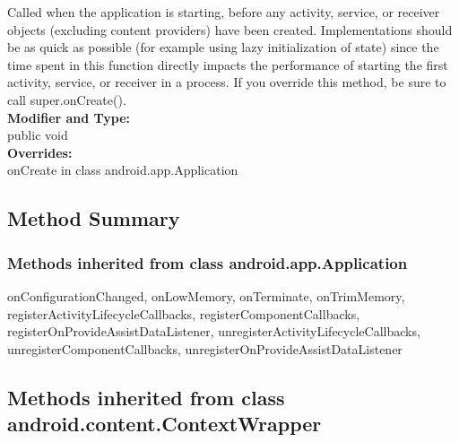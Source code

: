 Called when the application is starting, before any activity, service, or receiver objects (excluding content providers) have been created. Implementations should be as quick as possible (for example using lazy initialization of state) since the time spent in this function directly impacts the performance of starting the first activity, service, or receiver in a process. If you override this method, be sure to call super.onCreate().\\

\textbf{Modifier and Type:}\\
\tab public void\\

\textbf{Overrides:}\\
\tab         onCreate in class android.app.Application\\



\subsection{Method Summary}


\subsubsection{Methods inherited from class android.app.Application}

onConfigurationChanged, onLowMemory, onTerminate, onTrimMemory, registerActivityLifecycleCallbacks, registerComponentCallbacks, registerOnProvideAssistDataListener, unregisterActivityLifecycleCallbacks, unregisterComponentCallbacks, unregisterOnProvideAssistDataListener\\

\subsection{Methods inherited from class android.content.ContextWrapper}

